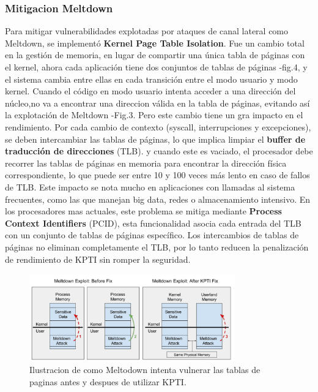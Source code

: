 \documentclass[lettersize,compsoc]{IEEEtran}
\begin{document}
\subsubsection{\textbf{Mitigacion Meltdown}}
\noindent  Para mitigar vulnerabilidades explotadas por ataques de canal lateral como Meltdown, se implementó \textbf{Kernel Page Table Isolation}\cite{PTI,Aleatorización}. Fue un cambio total en la gestión de memoria, en lugar de compartir una única tabla de páginas con el kernel, ahora cada aplicación tiene dos conjuntos de tablas de páginas -fig.4, y el sistema cambia entre ellas en cada transición entre el modo usuario y modo kernel. Cuando el código en modo usuario intenta acceder a una dirección del núcleo,no va a encontrar una direccion válida en la tabla de páginas, evitando así la explotación de Meltdown -Fig.3.
\noindent Pero este cambio tiene un gra impacto en el rendimiento. Por cada cambio de contexto (syscall, interrupciones y excepciones), se deben intercambiar las tablas de páginas, lo que implica limpiar el \textbf{buffer de traducción de direcciones} (TLB). y cuando este es  vaciado, el procesador debe recorrer las tablas de páginas en memoria para encontrar la dirección física correspondiente, lo que puede ser entre 10 y 100 veces más lento en caso de fallos de TLB. Este impacto se nota mucho en aplicaciones con llamadas al sistema frecuentes, como las que manejan big data, redes o almacenamiento intensivo.
\noindent                                                                                                                                                                                                               %
\noindent En los procesadores mas actuales, este problema se mitiga mediante \textbf{Process Context Identifiers}\cite{PCID} (PCID), esta funcionalidad asocia cada entrada del TLB con un conjunto de tablas de páginas específico. Los intercambios de tablas de páginas no eliminan completamente el TLB, por lo tanto reducen la penalización de rendimiento de KPTI sin romper la seguridad.
\begin{figure}[h]
  \centering
  \includegraphics[width=3.5in]{kpti-meltdown.png}
  \caption{\small Ilustracion de como Meltodown intenta vulnerar las tablas de paginas antes y despues de utilizar KPTI.}
\end{figure}
\end{document}
